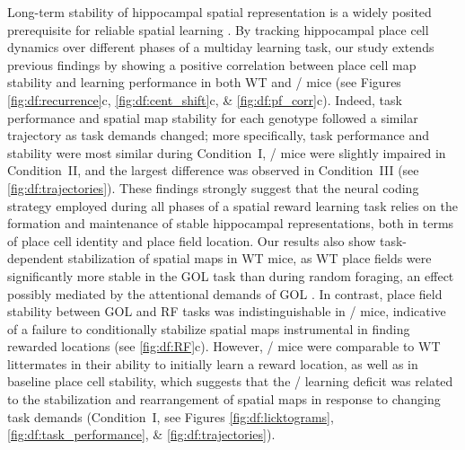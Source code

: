 Long-term stability of hippocampal spatial representation is a widely posited prerequisite for reliable spatial learning \citep{Kentros2004, Lever2002b, Mankin2012, Thompson1990, Ziv2013}. By tracking hippocampal place cell dynamics over different phases of a multiday learning task, our study extends previous findings by showing a positive correlation between place cell map stability and learning performance in both WT and \df/ mice (see Figures \ref{fig:df:recurrence}c, \ref{fig:df:cent_shift}c, \& \ref{fig:df:pf_corr}c). Indeed, task performance and spatial map stability for each genotype followed a similar trajectory as task demands changed; more specifically, task performance and stability were most similar during Condition~I, \df/ mice were slightly impaired in Condition~II, and the largest difference was observed in Condition~III (see \autoref{fig:df:trajectories}). These findings strongly suggest that the neural coding strategy employed during all phases of a spatial reward learning task relies on the formation and maintenance of stable hippocampal representations, both in terms of place cell identity and place field location. Our results also show task-dependent stabilization of spatial maps in WT mice, as WT place fields were significantly more stable in the GOL task than during random foraging, an effect possibly mediated by the attentional demands of GOL \citep{Kentros2004, Kobayashi1997, Markus1995, Monaco2014}. In contrast, place field stability between GOL and RF tasks was indistinguishable in \df/ mice, indicative of a failure to conditionally stabilize spatial maps instrumental in finding rewarded locations (see \autoref{fig:df:RF}c). However, \df/ mice were comparable to WT littermates in their ability to initially learn a reward location, as well as in baseline place cell stability, which suggests that the \df/ learning deficit was related to the stabilization and rearrangement of spatial maps in response to changing task demands (Condition~I, see Figures \ref{fig:df:licktograms}, \ref{fig:df:task_performance}, \& \ref{fig:df:trajectories}).

